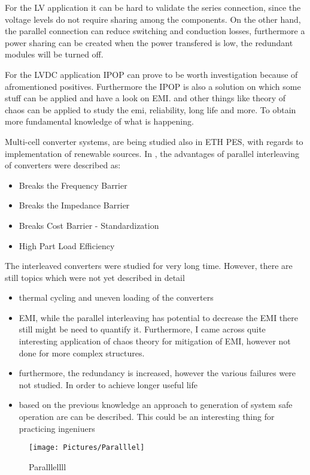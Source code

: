 \documentclass[]{scrartcl}
\begin{document}
For the LV application it can be hard to validate the series connection, since the voltage levels do not require sharing among the components. On the other hand, the parallel connection can reduce switching and conduction losses, furthermore a power sharing can be created when the power transfered is low, the redundant modules will be turned off. 

For the LVDC application IPOP can prove to be worth investigation because of afromentioned positives. Furthermore the IPOP is also a solution on which some stuff can be applied and have a look on EMI. and other things like theory of chaos can be applied to study the emi, reliability, long life and more. To obtain more fundamental knowledge of what is happening. 

Multi-cell converter systems, are being studied also in ETH PES, with regards to implementation of renewable sources. In \cite{Kolar2014a}, the advantages of parallel interleaving of converters were described as:
\begin{itemize}
	\item Breaks the Frequency Barrier
	\item Breaks the Impedance Barrier
	\item Breaks Cost Barrier - Standardization
	\item High Part Load Efficiency
\end{itemize}

The interleaved converters were studied for very long time. However, there are still topics which were not yet described in detail
\begin{itemize}
	\item thermal cycling and uneven loading of the converters
	\item EMI, while the parallel interleaving has potential to decrease the EMI there still might be need to quantify it. Furthermore, I came across quite interesting application of chaos theory for mitigation of EMI, however not done for more complex structures. 
	\item furthermore, the redundancy is increased, however the various failures were not studied. In order to achieve longer useful life
	\item based on the previous knowledge an approach to generation of system safe operation are can be described. This could be an interesting thing for practicing ingeniuers
\end{itemize}
\begin{figure}[h!]
	\centering
	\texttt{[image: Pictures/Paralllel]}
	\caption{Paralllellll}
	\label{fig:paralllel}
\end{figure}
\end{document}
